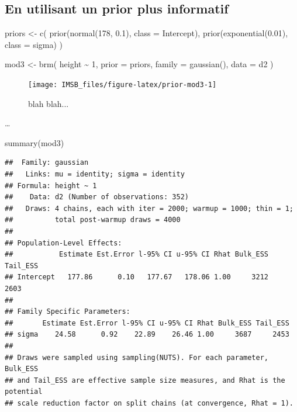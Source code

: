\documentclass[
  a4paper,11pt,twoside,onecolumn,openright,final,oldfontcommands]{memoir}
\newenvironment{Shaded}{\begin{snugshade}}{\end{snugshade}}
\newcommand{\AttributeTok}[1]{\textcolor[rgb]{0.77,0.63,0.00}{#1}}
\newcommand{\DecValTok}[1]{\textcolor[rgb]{0.00,0.00,0.81}{#1}}
\newcommand{\FloatTok}[1]{\textcolor[rgb]{0.00,0.00,0.81}{#1}}
\newcommand{\FunctionTok}[1]{\textcolor[rgb]{0.00,0.00,0.00}{#1}}
\newcommand{\NormalTok}[1]{#1}
\newcommand{\OtherTok}[1]{\textcolor[rgb]{0.56,0.35,0.01}{#1}}
\newcommand{\SpecialCharTok}[1]{\textcolor[rgb]{0.00,0.00,0.00}{#1}}
\theoremstyle{definition}
\theoremstyle{definition}
\theoremstyle{definition}
\theoremstyle{definition}
\theoremstyle{remark}
\begin{document}
\hypertarget{en-utilisant-un-prior-plus-informatif}{%
\subsection{En utilisant un prior plus informatif}\label{en-utilisant-un-prior-plus-informatif}}

\begin{Shaded}
\begin{Highlighting}[]
\NormalTok{priors }\OtherTok{\textless{}{-}} \FunctionTok{c}\NormalTok{(}
  \FunctionTok{prior}\NormalTok{(}\FunctionTok{normal}\NormalTok{(}\DecValTok{178}\NormalTok{, }\FloatTok{0.1}\NormalTok{), }\AttributeTok{class =}\NormalTok{ Intercept),}
  \FunctionTok{prior}\NormalTok{(}\FunctionTok{exponential}\NormalTok{(}\FloatTok{0.01}\NormalTok{), }\AttributeTok{class =}\NormalTok{ sigma)}
\NormalTok{  )}

\NormalTok{mod3 }\OtherTok{\textless{}{-}} \FunctionTok{brm}\NormalTok{(}
\NormalTok{  height }\SpecialCharTok{\textasciitilde{}} \DecValTok{1}\NormalTok{,}
  \AttributeTok{prior =}\NormalTok{ priors,}
  \AttributeTok{family =} \FunctionTok{gaussian}\NormalTok{(),}
  \AttributeTok{data =}\NormalTok{ d2}
\NormalTok{  )}
\end{Highlighting}
\end{Shaded}

\begin{figure}[!htb]

{\centering \texttt{[image: IMSB\_files/figure-latex/prior-mod3-1]} 

}

\caption{blah blah...}\label{fig:prior-mod3}
\end{figure}

\ldots{}

\begin{Shaded}
\begin{Highlighting}[]
\FunctionTok{summary}\NormalTok{(mod3)}
\end{Highlighting}
\end{Shaded}

\begin{verbatim}
##  Family: gaussian 
##   Links: mu = identity; sigma = identity 
## Formula: height ~ 1 
##    Data: d2 (Number of observations: 352) 
##   Draws: 4 chains, each with iter = 2000; warmup = 1000; thin = 1;
##          total post-warmup draws = 4000
## 
## Population-Level Effects: 
##           Estimate Est.Error l-95% CI u-95% CI Rhat Bulk_ESS Tail_ESS
## Intercept   177.86      0.10   177.67   178.06 1.00     3212     2603
## 
## Family Specific Parameters: 
##       Estimate Est.Error l-95% CI u-95% CI Rhat Bulk_ESS Tail_ESS
## sigma    24.58      0.92    22.89    26.46 1.00     3687     2453
## 
## Draws were sampled using sampling(NUTS). For each parameter, Bulk_ESS
## and Tail_ESS are effective sample size measures, and Rhat is the potential
## scale reduction factor on split chains (at convergence, Rhat = 1).
\end{verbatim}
\end{document}
